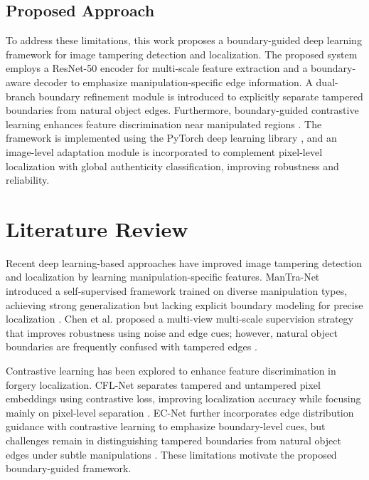 \documentclass[runningheads]{llncs}
\begin{document}
\subsection{Proposed Approach}

To address these limitations, this work proposes a boundary-guided deep learning framework for image tampering detection and localization. The proposed system employs a ResNet-50 encoder for multi-scale feature extraction \cite{he2016resnet} and a boundary-aware decoder to emphasize manipulation-specific edge information. A dual-branch boundary refinement module is introduced to explicitly separate tampered boundaries from natural object edges. Furthermore, boundary-guided contrastive learning enhances feature discrimination near manipulated regions \cite{niloy2023cfl,hao2024ecnet}. The framework is implemented using the PyTorch deep learning library \cite{paszke2019pytorch}, and an image-level adaptation module is incorporated to complement pixel-level localization with global authenticity classification, improving robustness and reliability.

\section{Literature Review}

Recent deep learning-based approaches have improved image tampering detection and localization by learning manipulation-specific features. ManTra-Net introduced a self-supervised framework trained on diverse manipulation types, achieving strong generalization but lacking explicit boundary modeling for precise localization \cite{wu2019mantra}. Chen et al. proposed a multi-view multi-scale supervision strategy that improves robustness using noise and edge cues; however, natural object boundaries are frequently confused with tampered edges \cite{chen2021multi}.

Contrastive learning has been explored to enhance feature discrimination in forgery localization. CFL-Net separates tampered and untampered pixel embeddings using contrastive loss, improving localization accuracy while focusing mainly on pixel-level separation \cite{niloy2023cfl}. EC-Net further incorporates edge distribution guidance with contrastive learning to emphasize boundary-level cues, but challenges remain in distinguishing tampered boundaries from natural object edges under subtle manipulations \cite{hao2024ecnet}. These limitations motivate the proposed boundary-guided framework.
\end{document}
